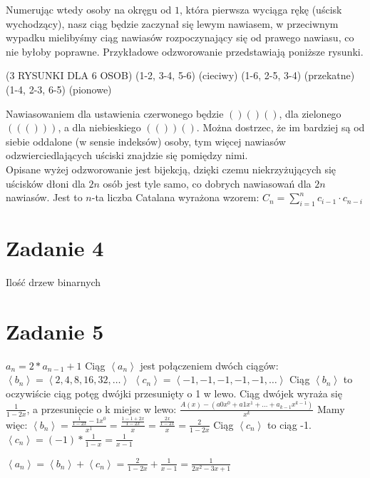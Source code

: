 \documentclass[12pt]{article}
\newcommand{\sequence}[1]{\left\langle #1 \right\rangle} %
\begin{document}
Numerując wtedy osoby na okręgu od $1$, która pierwsza wyciąga rękę (uścisk wychodzący), nasz ciąg będzie zaczynał się lewym nawiasem, w przeciwnym wypadku mielibyśmy ciąg nawiasów rozpoczynający się od prawego nawiasu, co nie byłoby poprawne. Przykładowe odzworowanie przedstawiają poniższe rysunki.

(3 RYSUNKI DLA 6 OSOB)
(1-2, 3-4, 5-6) (cieciwy)   
(1-6, 2-5, 3-4) (przekatne)
(1-4, 2-3, 6-5) (pionowe)

Nawiasowaniem dla ustawienia czerwonego będzie $()()()$, dla zielonego $((()))$, a dla niebieskiego $(())()$. Można dostrzec, że im bardziej są od siebie oddalone (w sensie indeksów) osoby, tym więcej nawiasów odzwierciedlających uściski znajdzie się pomiędzy nimi.\\

Opisane wyżej odzworowanie jest bijekcją, dzięki czemu niekrzyżujących się uścisków dłoni dla $2n$ osób jest tyle samo, co dobrych nawiasowań dla $2n$ nawiasów. Jest to $n$-ta liczba Catalana wyrażona wzorem:
$ C_n = \sum\limits_{i = 1}^{n} c_{i - 1} \cdot c_{n - i}$

\section{Zadanie 4}
Ilość drzew binarnych
\section{Zadanie 5}
$a_n = 2*a_{n-1} + 1$
Ciąg $\sequence{a_n}$ jest połączeniem dwóch ciągów:
$\sequence{b_n} = \sequence{2,4,8,16,32,\ldots}$
$\sequence{c_n} = \sequence{-1, -1, -1, -1, -1, \ldots}$
Ciąg $\sequence{b_n}$ to oczywiście ciąg potęg dwójki przesunięty o 1 w lewo. 
Ciąg dwójek wyraża się 
$\frac{1}{1-2x}$, a przesunięcie o k miejsc w lewo:
$\frac{A(x) - (a0x^0+a1x^1+\ldots+a_{k-1}x^{k-1})}{x^k}$
Mamy więc:
$\sequence{b_n} = \frac{\frac{1}{1-2x} - 1x^0}{x^1} = \frac{\frac{1-1+2x}{1-2x}}{x} = \frac{\frac{2x}{1-2x}}{x} = \frac{2}{1-2x}$
Ciąg $\sequence{c_n}$ to ciąg -1.
$\sequence{c_n} = (-1) * \frac{1}{1-x} = \frac{1}{x-1}$

$\sequence{a_n} = \sequence{b_n} + \sequence{c_n} = \frac{2}{1-2x} + \frac{1}{x-1} = \frac{1}{2x^2-3x+1}$
\end{document}
